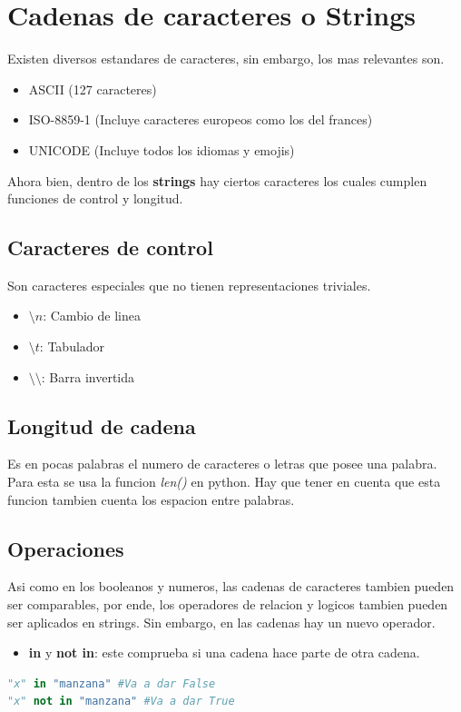 \documentclass{article}
\begin{document}
\section{Cadenas de caracteres o Strings}
Existen diversos estandares de caracteres, sin embargo, los mas relevantes son.
\begin{itemize}
    \item ASCII (127 caracteres)
    \item ISO-8859-1 (Incluye caracteres europeos como los del frances)
    \item UNICODE (Incluye todos los idiomas y emojis)
\end{itemize}
Ahora bien, dentro de los \textbf{strings} hay ciertos caracteres los cuales cumplen funciones de control y longitud.
\subsection{Caracteres de control}
Son caracteres especiales que no tienen representaciones triviales.
\begin{itemize}
    \item $\setminus n$: Cambio de linea
    \item $\setminus t$: Tabulador
    \item $\setminus \setminus$: Barra invertida
\end{itemize}
\subsection{Longitud de cadena}
Es en pocas palabras el numero de caracteres o letras que posee una palabra. Para esta se usa la funcion \textit{len()} en python. Hay que tener en cuenta que esta funcion tambien cuenta los espacion entre palabras. 
\subsection{Operaciones}
Asi como en los booleanos y numeros, las cadenas de caracteres tambien pueden ser comparables, por ende, los operadores de relacion y logicos tambien pueden ser aplicados en strings. Sin embargo, en las cadenas hay un nuevo operador.
\begin{itemize}
    \item \textbf{in} y \textbf{not in}: este comprueba si una cadena hace parte de otra cadena. 
\end{itemize}
\begin{lstlisting}[language=Python, caption=Operacion in]
"x" in "manzana" #Va a dar False
"x" not in "manzana" #Va a dar True
\end{lstlisting}
\end{document}
